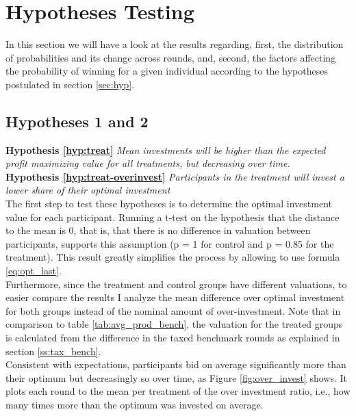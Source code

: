 \section{Hypotheses Testing}

In this section we will have a look at the results regarding, first, the distribution of probabilities and its change across rounds, and, second, the factors affecting the probability of winning for a given individual according to the hypotheses postulated in section \ref{sec:hyp}.


\subsection{Hypotheses 1 and 2}

\textbf{Hypothesis \ref{hyp:treat}} \textit{Mean investments will be higher than the expected profit maximizing value for all treatments, but decreasing over time.}\\ 
\textbf{Hypothesis \ref{hyp:treat-overinvest}} \textit{Participants in the treatment will invest a lower share of their optimal investment}\\

The first step to test these hypotheses is to determine the optimal investment value for each participant. Running a t-test on the hypothesis that the distance to the mean is 0, that is, that there is no difference in valuation between participants, supports this assumption (p = 1 for control and p = 0.85 for the treatment). This result greatly simplifies the process by allowing to use formula \ref{eq:opt_last}.\\

Furthermore, since the treatment and control groups have different valuations, to easier compare the results I analyze the mean difference over optimal investment for both groups instead of the nominal amount of over-investment. Note that in comparison to table \ref{tab:avg_prod_bench}, the valuation for the treated groups is calculated from the difference in the taxed benchmark rounds as explained in section \ref{ss:tax_bench}.\\

Consistent with expectations, participants bid on average significantly more than their optimum but decreasingly so over time, as Figure \ref{fig:over_invest} shows. It plots each round to the mean per treatment of the over investment ratio, i.e., how many times more than the optimum was invested on average.\\

